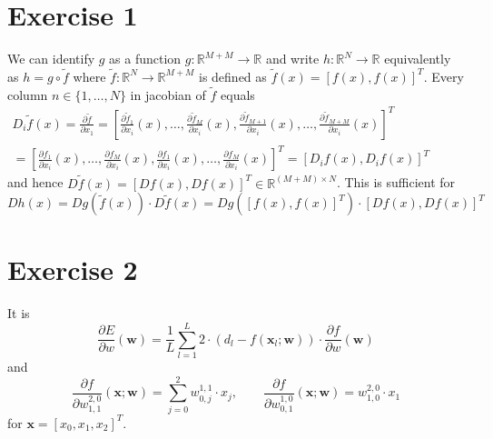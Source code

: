 \documentclass[10pt]{article} %
\newcommand{\R}{\mathbb{R}}
\begin{document}
\section*{Exercise 1}

We can identify $g$ as a function $g : \R^{M+M} \to \R$ and write $h : \R^N \to \R$
equivalently as $h = g \circ \tilde f$ where $\tilde f : \R^N \to \R^{M+M}$ is
defined as $\tilde f(x) = [ f(x), f(x) ]^T$.
Every column $n \in \{1, \dots, N\}$ in jacobian of $\tilde f$ equals
\[
  \begin{array}{r}
    D_i \tilde f (x) = \frac{\partial \tilde f}{\partial x_1}
    = \left[
      \frac{\partial \tilde f_1}{\partial x_i}(x),
      \dots,
      \frac{\partial \tilde f_M}{\partial x_i}(x),
      \frac{\partial \tilde f_{M+1}}{\partial x_i}(x),
      \dots,
      \frac{\partial \tilde f_{M+M}}{\partial x_i}(x)
    \right]^T \qquad \qquad \qquad \qquad \qquad \qquad \\
    = \left[
      \frac{\partial f_1}{\partial x_i}(x),
      \dots,
      \frac{\partial f_M}{\partial x_i}(x),
      \frac{\partial f_1}{\partial x_i}(x),
      \dots,
      \frac{\partial f_M}{\partial x_i}(x)
    \right]^T
    = [D_i f(x), D_i f(x)]^T
  \end{array}
\]
and hence $D \tilde f(x) = [D f(x), D f(x)]^T \in \R^{(M+M) \times N}$.
This is sufficient for
\[
  Dh(x) = Dg(\tilde f(x)) \cdot D \tilde f(x)
  = Dg([f(x), f(x)]^T) \cdot [Df(x), Df(x)]^T
\]


\section*{Exercise 2}

It is
\[
  \frac{\partial E}{\partial w}(\mathbf w)
  = \frac 1 L \sum_{l=1}^L 2 \cdot (d_l - f(\mathbf x_l; \mathbf w)) \cdot
    \frac{\partial f}{\partial w}(\mathbf w)
\]
and
\[
  \frac{\partial f}{\partial w^{2,0}_{1,1}}(\mathbf x; \mathbf w)
  = \sum_{j=0}^2 w_{0,j}^{1,1} \cdot x_j, \qquad
  \frac{\partial f}{\partial w^{1,0}_{0,1}}(\mathbf x; \mathbf w)
  = w^{2,0}_{1,0} \cdot x_1
\]
for $\mathbf x = [x_0, x_1, x_2]^T$.
\end{document}
